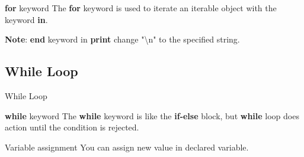 \documentclass{beamer}
\begin{document}
\begin{frame}
    \begin{block}{\textbf{for} keyword}
        The \textbf{for} keyword is used to iterate an iterable object with the keyword \textbf{in}.
    \end{block}
    \begin{example}
        
        \textbf{Note}: \textbf{end} keyword in \textbf{print} change "\textbackslash n" to the specified string.
    \end{example}
\end{frame}

\subsection{While Loop}
\begin{frame}{While Loop}
    \begin{block}{\textbf{while} keyword}
        The \textbf{while} keyword is like the \textbf{if-else} block, but \textbf{while} loop does action until the condition is rejected.
    \end{block}
    \begin{block}{Variable assignment}
        You can assign new value in declared variable.
        
    \end{block}
\end{frame}

\begin{frame}
    \begin{example}
        
    \end{example}
\end{frame}
\end{document}

